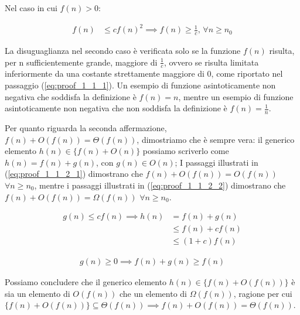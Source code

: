 \documentclass{article}
\begin{document}
\noindent
Nel caso in cui $f(n) > 0$:

\begin{equation} \label{eq:proof_1_1_1}
\begin{aligned}
f(n) &\le cf(n)^2 \implies f(n) \ge \frac{1}{c} \text{,  } \forall n \ge n_0
\end{aligned}
\end{equation}

\noindent
La disuguaglianza nel secondo caso è verificata solo se la funzione $f(n)$ risulta, per n sufficientemente grande, maggiore di $\frac{1}{c}$, ovvero se risulta limitata inferiormente da una costante strettamente maggiore di 0, come riportato nel passaggio (\ref{eq:proof_1_1_1}).
Un esempio di funzione asintoticamente non negativa che soddisfa la definizione è $f(n) = n$, mentre un esempio di funzione asintoticamente non negativa che non soddisfa la definizione è $f(n) = \frac{1}{n}$.
\vspace{\baselineskip}

\noindent
Per quanto riguarda la seconda affermazione, $f(n) + O(f(n)) =  \Theta(f(n))$, dimostriamo che è sempre vera: il generico elemento $h(n) \in \{f(n) + O(n)\}$ possiamo scriverlo come $h(n) = f(n) + g(n)$, con $g(n) \in O(n)$; I passaggi illustrati in  (\ref{eq:proof_1_1_2_1}) dimostrano che $f(n) + O(f(n)) = O(f(n))$ $\forall n \ge n_0$, mentre i passaggi illustrati in (\ref{eq:proof_1_1_2_2}) dimostrano che $f(n) + O(f(n)) = \Omega(f(n))$ $\forall n \ge n_0$. 

\begin{equation} \label{eq:proof_1_1_2_1}
\begin{aligned}
g(n) \le cf(n) \implies h(n) &= f(n) + g(n) \\ &\le f(n) + cf(n) \\ 
&\le (1+c)f(n) 
\end{aligned}
\end{equation}

\begin{equation} \label{eq:proof_1_1_2_2}
\begin{aligned}
g(n) \ge 0 \implies f(n) + g(n) \ge f(n)
\end{aligned}
\end{equation}

\noindent
Possiamo concludere che il generico elemento $h(n) \in \{f(n)+O(f(n))\}$ è sia un elemento di $O(f(n))$ che un elemento di $\Omega(f(n))$, ragione per cui $\{f(n)+O(f(n))\} \subseteq {\Theta(f(n))} \implies f(n) + O(f(n)) = \Theta(f(n))$.
\end{document}
